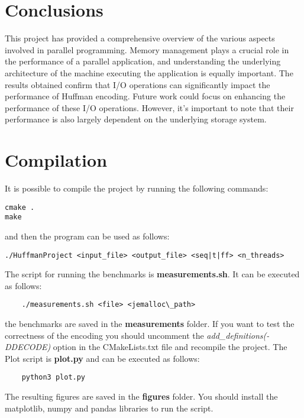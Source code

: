 \documentclass{article}
\begin{document}
\section {Conclusions}
This project has provided a comprehensive overview of the various aspects involved in parallel programming.
Memory management plays a crucial role in the performance of a parallel application, and understanding the
underlying architecture of the machine executing the application is equally important. The results obtained
confirm that I/O operations can significantly impact the performance of Huffman encoding. Future work could
focus on enhancing the performance of these I/O operations. However, it's important to note that their performance
is also largely dependent on the underlying storage system.

\section{Compilation}
It is possible to compile the project by running the following commands:
\begin{verbatim}
cmake .
make
\end{verbatim}
and then the program can be used as follows:
\begin{verbatim}
./HuffmanProject <input_file> <output_file> <seq|t|ff> <n_threads>
\end{verbatim}
The script for running the benchmarks is \textbf{measurements.sh}.
It can be executed as follows:
\begin{verbatim}
    ./measurements.sh <file> <jemalloc\_path>
\end{verbatim}
the benchmarks are saved in the \textbf{measurements} folder.
If you want to test the correctness of the encoding you should uncomment the \textit{add\_definitions(-DDECODE)} option in the CMakeLists.txt file
and recompile the project.
The Plot script is \textbf{plot.py} and can be executed as follows:
\begin{verbatim}
    python3 plot.py
\end{verbatim}
The resulting figures are saved in the \textbf{figures} folder.
You should install the matplotlib, numpy and pandas libraries to run the script.
\end{document}
